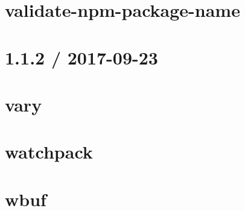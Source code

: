 \documentclass[twoside]{book}
\newcommand{\+}{\discretionary{\mbox{\scriptsize$\hookleftarrow$}}{}{}}
\begin{document}
\chapter{validate-\/npm-\/package-\/name}
\label{md__c___users_vaishnavi_jadhav__desktop__developer_code_mean_stack_example_client_node_modules_vd3283ec10a1fd07f33e558805e8f724b}

\chapter{1.1.2 / 2017-\/09-\/23}
\label{md__c___users_vaishnavi_jadhav__desktop__developer_code_mean_stack_example_client_node_modules_vary__h_i_s_t_o_r_y}

\chapter{vary}
\label{md__c___users_vaishnavi_jadhav__desktop__developer_code_mean_stack_example_client_node_modules_vary__r_e_a_d_m_e}

\chapter{watchpack}
\label{md__c___users_vaishnavi_jadhav__desktop__developer_code_mean_stack_example_client_node_modules_watchpack__r_e_a_d_m_e}

\chapter{wbuf}
\label{md__c___users_vaishnavi_jadhav__desktop__developer_code_mean_stack_example_client_node_modules_wbuf__r_e_a_d_m_e}

\end{document}

